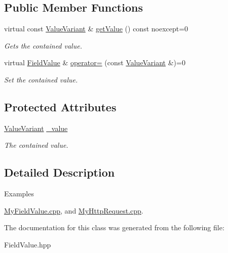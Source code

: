 \subsection*{Public Member Functions}
\begin{DoxyCompactItemize}
\item 
\mbox{\label{classZiApi_1_1FieldValue_abfc23c5c8eca45110475c291ce4fcd6a}} 
virtual const \mbox{\hyperlink{classZiApi_1_1FieldValue_aa05c96baba965d0ad1cd54c7878f4450}{Value\+Variant}} \& \mbox{\hyperlink{classZiApi_1_1FieldValue_abfc23c5c8eca45110475c291ce4fcd6a}{get\+Value}} () const noexcept=0
\begin{DoxyCompactList}\small\item\em Gets the contained value. \end{DoxyCompactList}\item 
\mbox{\label{classZiApi_1_1FieldValue_ae8b2b66a78907d11d5745af783561efa}} 
virtual \mbox{\hyperlink{classZiApi_1_1FieldValue}{Field\+Value}} \& \mbox{\hyperlink{classZiApi_1_1FieldValue_ae8b2b66a78907d11d5745af783561efa}{operator=}} (const \mbox{\hyperlink{classZiApi_1_1FieldValue_aa05c96baba965d0ad1cd54c7878f4450}{Value\+Variant}} \&)=0
\begin{DoxyCompactList}\small\item\em Set the contained value. \end{DoxyCompactList}\end{DoxyCompactItemize}
\subsection*{Protected Attributes}
\begin{DoxyCompactItemize}
\item 
\mbox{\label{classZiApi_1_1FieldValue_a597ab052783a2fe3e6cb87a8a6276f38}} 
\mbox{\hyperlink{classZiApi_1_1FieldValue_aa05c96baba965d0ad1cd54c7878f4450}{Value\+Variant}} \mbox{\hyperlink{classZiApi_1_1FieldValue_a597ab052783a2fe3e6cb87a8a6276f38}{\+\_\+value}}
\begin{DoxyCompactList}\small\item\em The contained value. \end{DoxyCompactList}\end{DoxyCompactItemize}


\subsection{Detailed Description}
\begin{Desc}
\item[Examples]\par
\mbox{\hyperlink{MyFieldValue_8cpp-example}{My\+Field\+Value.\+cpp}}, and \mbox{\hyperlink{MyHttpRequest_8cpp-example}{My\+Http\+Request.\+cpp}}.\end{Desc}


The documentation for this class was generated from the following file\+:\begin{DoxyCompactItemize}
\item 
Field\+Value.\+hpp\end{DoxyCompactItemize}
